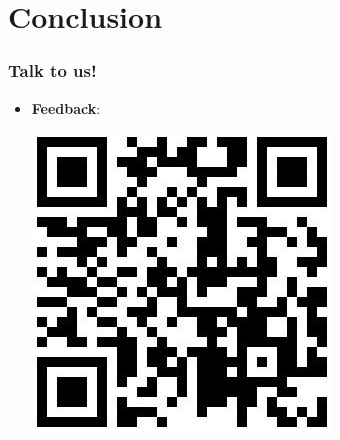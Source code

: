 \documentclass[12pt]{beamer}
\begin{document}
\section{Conclusion}

\begin{frame}
  \frametitle{Talk to us!}
  \begin{center}
  \begin{itemize}
\item \textbf{Feedback}:

        \includegraphics[width=0.5\linewidth]{image.png}

  \end{itemize}
\end{center}
\end{frame}
\end{document}
